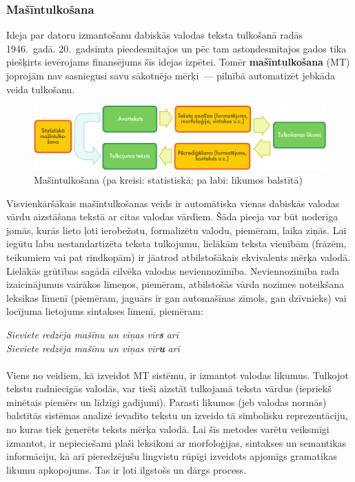 \begin{multicols}{2}
\subsubsection{Mašīntulkošana}

Ideja par datoru izmantošanu dabiskās valodas teksta tulkošanā radās 1946.~gadā.
20.~gadsimta piecdesmitajos un pēc tam astoņdesmitajos gados tika piešķirts ievērojams finansējums šīs idejas izpētei.
Tomēr \textbf{mašīntulkošana} (MT) joprojām nav sasniegusi savu sākotnējo mērķi~--- pilnībā automatizēt jebkāda veida tulkošanu.

\begin{figure}[htb]
  \center
  \includegraphics[width=\textwidth]{../_media/latvian/machine_translation}
  \caption{Mašīntulkošana (pa kreisi: statistiskā; pa labi: likumos balstītā)}
  \label{fig:mtarch_de}
\end{figure}


Visvienkāršākais mašīntulkošanas veids ir automātiska vienas dabiskās valodas vārdu aizstāšana tekstā ar citas valodas vārdiem. 
Šāda pieeja var būt noderīga jomās, kurās lieto ļoti ierobežotu, formalizētu valodu, piemēram, laika ziņās.
Lai iegūtu labu nestandartizēta teksta tulkojumu, lielākām teksta vienībām (frāzēm, teikumiem vai pat rindkopām) ir jāatrod atbilstošākais ekvivalents mērķa valodā. Lielākās grūtības sagādā cilvēka valodas neviennozīmība. 
Neviennozīmība rada izaicinājumus vairākos līmeņos, piemēram, atbilstošās vārda nozīmes noteikšana leksikas līmenī (piemēram, jaguārs ir gan automašīnas zīmols, gan dzīvnieks) vai locījuma lietojums sintakses līmenī, piemēram:

\textit{Sieviete redzēja mašīnu un viņas vīr}\textbf{\textit{s}}\textit{ arī}\\
\textit{Sieviete redzēja mašīnu un viņas vīr}\textbf{\textit{u}}\textit{ arī}\\
\\
Viens no veidiem, kā izveidot MT sistēmu, ir izmantot valodas likumus. 
Tulkojot tekstu radniecīgās valodās, var tieši aizstāt tulkojamā teksta vārdus (iepriekš minētais piemērs un līdzīgi gadījumi). 
Parasti likumos (jeb valodas normās) balstītās sistēmas analizē ievadīto tekstu un izveido tā simbolisku reprezentāciju, no kuras tiek ģenerēts teksts mērķa valodā. 
Lai šīs metodes varētu veiksmīgi izmantot, ir nepieciešami plaši leksikoni ar morfoloģijas, sintakses un semantikas informāciju, kā arī pieredzējušu lingvistu rūpīgi izveidots apjomīgs gramatikas likumu apkopojums. 
Tas ir ļoti ilgstošs un dārgs process.


\end{multicols}
